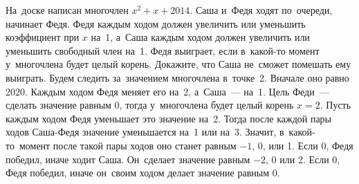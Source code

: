 \problem{}
На~доске написан многочлен $x^2 + x + 2014$.
Саша и~Федя ходят по~очереди, начинает Федя.
Федя каждым ходом должен увеличить или уменьшить коэффициент при $x$ на~1,
а~Саша каждым ходом должен увеличить или уменьшить свободный член на~1.
Федя выиграет, если в~какой-то момент у~многочлена будет целый корень.
Докажите, что Саша не~сможет помешать ему выиграть.
\solution
Будем следить за~значением многочлена в~точке~2.
Вначале оно равно 2020.
Каждым ходом Федя меняет его на~2, а~Саша~--- на~1.
Цель Феди~--- сделать значение равным 0, тогда у~многочлена будет целый корень
$x = 2$.
Пусть каждым ходом Федя уменьшает это значение на~2.
Тогда после каждой пары ходов Саша-Федя значение уменьшается на~1 или на~3.
Значит, в~какой-то~момент после такой пары ходов оно станет равным $-1$, 0,
или 1.
Если 0, Федя победил, иначе ходит Саша.
Он~сделает значение равным $-2$, 0 или 2.
Если 0, Федя победил, иначе он~своим ходом делает значение равным 0.
\endproblem
